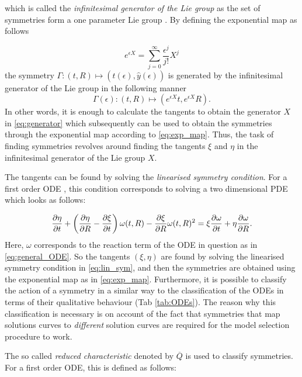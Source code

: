   
which is called the \textit{infinitesimal generator of the Lie group} as the set of symmetries form a one parameter Lie group \cite{hydon2000symmetry}. By defining the exponential map as follows

$$e^{\epsilon X}=\sum_{j=0}^{\infty}\frac{\epsilon^j}{j!}X^j$$
the symmetry $\Gamma:(t,R)\mapsto(\hat{t}(\epsilon),\hat{y}(\epsilon))$ is generated by the infinitesimal generator of the Lie group in the following manner
\begin{equation}
  \Gamma(\epsilon):(t,R)\mapsto\left(e^{\epsilon X}t,e^{\epsilon X}R\right).
  \label{eq:exp_map}
\end{equation}
In other words, it is enough to calculate the tangents to obtain the generator $X$ in \eqref{eq:generator} which subsequently can be used to obtain the symmetries through the exponential map according to \eqref{eq:exp_map}. Thus, the task of finding symmetries revolves around finding the tangents $\xi$ and $\eta$ in the infinitesimal generator of the Lie group $X$.

The tangents can be found by solving the \textit{linearised symmetry condition}. For a first order ODE \cite{hydon2000symmetry}, this condition corresponds to solving a two dimensional PDE which looks as follows:

\begin{equation}
  \pdv{\eta}{t}+\left(\pdv{\eta}{R}-\pdv{\xi}{t}\right)\omega(t,R)-\pdv{\xi}{R}\omega(t,R)^2=\xi\pdv{\omega}{t}+\eta\pdv{\omega}{R}.
  \label{eq:lin_sym}
\end{equation}
Here, $\omega$ corresponds to the reaction term of the ODE in question as in \eqref{eq:general_ODE}. So the tangents $(\xi,\eta)$ are found by solving the linearised symmetry condition in \eqref{eq:lin_sym}, and then the symmetries are obtained using the exponential map as in \eqref{eq:exp_map}. Furthermore, it is possible to classify the action of a symmetry in a similar way to the classification of the ODEs in terms of their qualitative behaviour (Tab \ref{tab:ODEs}). The reason why this classification is necessary is on account of the fact that symmetries that map solutions curves to \textit{different} solution curves are required for the model selection procedure to work.

The so called \textit{reduced characteristic} denoted by $\overline{Q}$ is used to classify symmetries. For a first order ODE, this is defined as follows: \cite{hydon2000symmetry}

